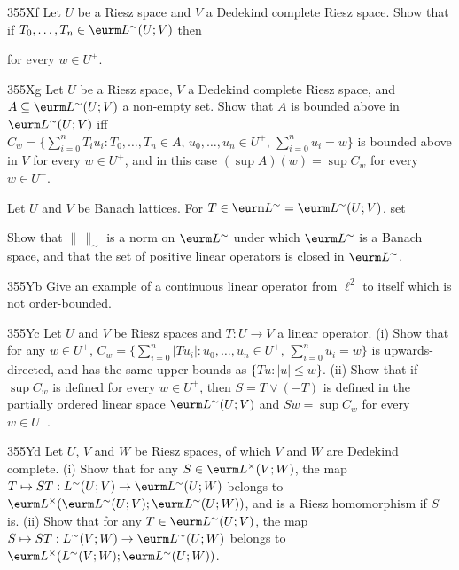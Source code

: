 {\sqheader 355Xf Let $U$ be a Riesz space and $V$ a Dedekind complete
Riesz space.   Show that if $T_0,\ldots,T_n\in\eurm L^{\sim}(U;V)$ then


\noindent for every $w\in U^+$.

\sqheader 355Xg Let $U$ be a Riesz space, $V$ a Dedekind complete Riesz
space, and $A\subseteq\eurm L^{\sim}(U;V)$ a non-empty set.   Show that
$A$ is bounded above in $\eurm L^{\sim}(U;V)$ iff
$C_w=\{\sum_{i=0}^nT_iu_i:T_0,\ldots,T_n\in A,\,u_0,\ldots,u_n\in
U^+,\,\sum_{i=0}^nu_i=w\}$ is bounded above in $V$ for every $w\in U^+$,
and in this case $(\sup A)(w)=\sup C_w$ for every $w\in U^+$.

Let $U$ and $V$ be Banach lattices.   For
$T\in\eurm L^{\sim}=\eurm L^{\sim}(U;V)$, set


\noindent Show that
$\|\,\|_{\sim}$ is a norm on $\eurm L^{\sim}$ under which $\eurm
L^{\sim}$ is a Banach space, and that the set of positive linear
operators is closed in $\eurm L^{\sim}$.

\spheader 355Yb Give an example of a continuous linear operator from
$\ell^2$ to itself which is not order-bounded.

\spheader 355Yc Let $U$ and $V$ be Riesz spaces and $T:U\to V$ a linear
operator.   (i) Show that for any $w\in U^+$,
$C_w=\{\sum_{i=0}^n|Tu_i|:u_0,\ldots,u_n\in U^+,\,\sum_{i=0}^nu_i=w\}$
is upwards-directed, and has the same upper bounds as $\{Tu:|u|\le w\}$.
(ii) Show that if $\sup C_w$ is defined for every
$w\in U^+$, then $S=T\vee(-T)$ is defined in the partially ordered
linear space $\eurm L^{\sim}(U;V)$ and $Sw=\sup C_w$ for every
$w\in U^+$.

\spheader 355Yd Let $U$, $V$ and $W$ be Riesz spaces, of which $V$ and
$W$ are Dedekind complete.   (i) Show that for any $S\in\eurm
L^{\times}(V;W)$, the map $T\mapsto ST:L^{\sim}(U;V)\to\eurm
L^{\sim}(U;W)$ belongs to $\eurm L^{\times}(\eurm L^{\sim}(U;V);\eurm
L^{\sim}(U;W))$, and is a Riesz homomorphism if $S$ is.   
(ii) Show that for any
$T\in\eurm L^{\sim}(U;V)$, the map $S\mapsto ST:L^{\sim}(V;W)\to\eurm
L^{\sim}(U;W)$ belongs to $\eurm L^{\times}(L^{\sim}(V;W);\eurm
L^{\sim}(U;W))$.

}
